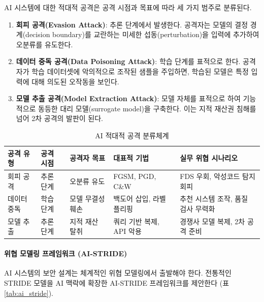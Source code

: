 AI 시스템에 대한 적대적 공격은 공격 시점과 목표에 따라 세 가지 범주로 분류된다.

\begin{enumerate}
 \item \textbf{회피 공격(Evasion Attack)}: 추론 단계에서 발생한다. 공격자는 모델의 결정 경계(decision boundary)를 교란하는 미세한 섭동(perturbation)을 입력에 추가하여 오분류를 유도한다.
 \item \textbf{데이터 중독 공격(Data Poisoning Attack)}: 학습 단계를 표적으로 한다. 공격자가 학습 데이터셋에 악의적으로 조작된 샘플을 주입하면, 학습된 모델은 특정 입력에 대해 의도된 오작동을 보인다.
 \item \textbf{모델 추출 공격(Model Extraction Attack)}: 모델 자체를 표적으로 하여 기능적으로 동등한 대리 모델(surrogate model)을 구축한다. 이는 지적 재산권 침해를 넘어 2차 공격의 발판이 된다.
\end{enumerate}

\begin{table}[htbp]
\centering
\caption{AI 적대적 공격 분류체계}
\label{tab:adversarial_attack_taxonomy}
\begin{tabularx}{\textwidth}{p{2cm}p{2cm}Xp{2.5cm}X}
\toprule
\textbf{공격 유형} & \textbf{공격 시점} & \textbf{공격자 목표} & \textbf{대표적 기법} & \textbf{실무 위협 시나리오} \\
\midrule
회피 공격 & 추론 단계 & 오분류 유도 & FGSM, PGD, C\&W & FDS 우회, 악성코드 탐지 회피 \\
데이터 중독 & 학습 단계 & 모델 무결성 훼손 & 백도어 삽입, 라벨 플리핑 & 추천 시스템 조작, 품질 검사 무력화 \\
모델 추출 & 추론 단계 & 지적 재산 탈취 & 쿼리 기반 복제, API 악용 & 경쟁사 모델 복제, 2차 공격 준비 \\
\bottomrule
\end{tabularx}
\end{table}

\paragraph{위협 모델링 프레임워크 (AI-STRIDE)}

AI 시스템의 보안 설계는 체계적인 위협 모델링에서 출발해야 한다. 전통적인 STRIDE 모델을 AI 맥락에 확장한 AI-STRIDE 프레임워크를 제안한다 (표 \ref{tab:ai_stride}).

